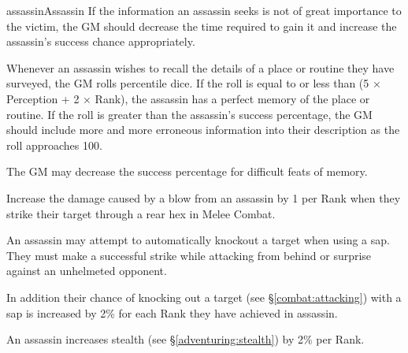 \begin{Skill}{assassin}{Assassin}
If the information an assassin seeks is not of great importance to the
victim, the GM should decrease the time required to gain it and
increase the assassin’s success chance appropriately.


Whenever an assassin wishes to recall the details of a place or
routine they have surveyed, the GM rolls percentile dice.  If the roll
is equal to or less than (5 × Perception + 2 × Rank), the assassin has
a perfect memory of the place or routine. If the roll is greater than
the assassin’s success percentage, the GM should include more and more
erroneous information into their description as the roll approaches
100.

The GM may decrease the success percentage for difficult feats of
memory.



Increase the damage caused by a blow from an assassin by 1 per Rank
when they strike their target through a rear hex in Melee Combat.


An assassin may attempt to automatically knockout a target when using
a sap.  They must make a successful strike while attacking from behind
or surprise against an unhelmeted opponent.

In addition their chance of knocking out a target (see
\S\ref{combat:attacking}) with a sap is increased by 2\% for each Rank
they have achieved in assassin.


An assassin increases stealth (see \S\ref{adventuring:stealth}) by 2\%
per Rank.

\end{Skill}
